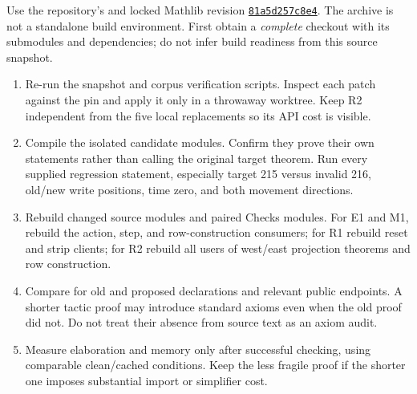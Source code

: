 Use the repository's  and locked Mathlib revision \href{https://github.com/leanprover-community/mathlib4/commit/81a5d257c8e410db227a6665ed08f64fea08e997}{\texttt{81a5d257c8e4}}. The archive is not a standalone build environment. First obtain a \emph{complete} checkout with its submodules and dependencies; do not infer build readiness from this source snapshot.

\begin{enumerate}
\item Re-run the snapshot and corpus verification scripts. Inspect each patch against the pin and apply it only in a throwaway worktree. Keep R2 independent from the five local replacements so its API cost is visible.
\item Compile the isolated candidate modules. Confirm they prove their own statements rather than calling the original target theorem. Run every supplied regression statement, especially target 215 versus invalid 216, old/new write positions, time zero, and both movement directions.
\item Rebuild changed source modules and paired Checks modules. For E1 and M1, rebuild the action, step, and row-construction consumers; for R1 rebuild reset and strip clients; for R2 rebuild all users of west/east projection theorems and row construction.
\item Compare  for old and proposed declarations and relevant public endpoints. A shorter tactic proof may introduce standard axioms even when the old proof did not. Do not treat their absence from source text as an axiom audit.
\item Measure elaboration and memory only after successful checking, using comparable clean/cached conditions. Keep the less fragile proof if the shorter one imposes substantial import or simplifier cost.
\end{enumerate}

